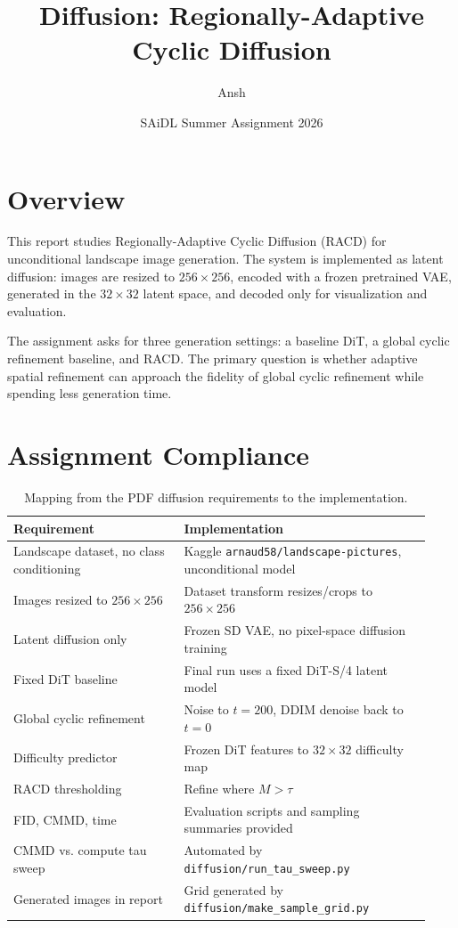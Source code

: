 \documentclass{article}
\title{Diffusion: Regionally-Adaptive Cyclic Diffusion}
\author{Ansh}
\date{SAiDL Summer Assignment 2026}
\begin{document}
\maketitle

\section{Overview}

This report studies Regionally-Adaptive Cyclic Diffusion (RACD) for
unconditional landscape image generation. The system is implemented as latent
diffusion: images are resized to $256 \times 256$, encoded with a frozen
pretrained VAE, generated in the $32 \times 32$ latent space, and decoded only
for visualization and evaluation.

The assignment asks for three generation settings: a baseline DiT, a global
cyclic refinement baseline, and RACD. The primary question is whether adaptive
spatial refinement can approach the fidelity of global cyclic refinement while
spending less generation time.

\section{Assignment Compliance}

\begin{table}[H]
\centering
\small
\begin{tabular}{p{0.38\linewidth}p{0.55\linewidth}}
\toprule
Requirement & Implementation \\
\midrule
Landscape dataset, no class conditioning & Kaggle \texttt{arnaud58/landscape-pictures}, unconditional model \\
Images resized to $256 \times 256$ & Dataset transform resizes/crops to $256 \times 256$ \\
Latent diffusion only & Frozen SD VAE, no pixel-space diffusion training \\
Fixed DiT baseline & Final run uses a fixed DiT-S/4 latent model \\
Global cyclic refinement & Noise to $t=200$, DDIM denoise back to $t=0$ \\
Difficulty predictor & Frozen DiT features to $32 \times 32$ difficulty map \\
RACD thresholding & Refine where $M > \tau$ \\
FID, CMMD, time & Evaluation scripts and sampling summaries provided \\
CMMD vs. compute tau sweep & Automated by \texttt{diffusion/run\_tau\_sweep.py} \\
Generated images in report & Grid generated by \texttt{diffusion/make\_sample\_grid.py} \\
\bottomrule
\end{tabular}
\caption{Mapping from the PDF diffusion requirements to the implementation.}
\end{table}
\end{document}
